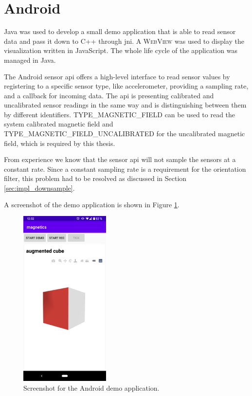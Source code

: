 \section{Android}

Java was used to develop a small demo application that is able to read sensor data and pass it down to C++ through \gls{jni}. A \textsc{WebView} was used to display the visualization written in JavaScript. The whole life cycle of the application was managed in Java.

The Android sensor \gls{api} offers a high-level interface to read sensor values by registering to a specific sensor type, like accelerometer, providing a sampling rate, and a callback for incoming data. The \gls{api} is presenting calibrated and uncalibrated sensor readings in the same way and is distinguishing between them by different identifiers. \textsc{TYPE\_MAGNETIC\_FIELD} can be used to read the system calibrated magnetic field and \textsc{TYPE\_MAGNETIC\_FIELD\_UNCALIBRATED} for the uncalibrated magnetic field, which is required by this thesis.\cite{android_sdk_sensormanager}

From experience we know that the sensor \gls{api} will not sample the sensors at a constant rate. Since a constant sampling rate is a requirement for the orientation filter, this problem had to be resolved as discussed in Section \ref{sec:impl_downsample}.

A screenshot of the demo application is shown in Figure \ref{fig:app}.

\begin{figure}[hbt!]
    \centering
    \includegraphics[width=0.4\textwidth]{figures/app.png}
    \caption{Screenshot for the Android demo application.}
    \label{fig:app}
\end{figure}

